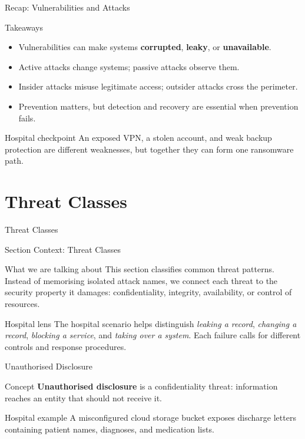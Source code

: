 \documentclass[presentation]{beamer}
\newcommand{\sectiontitleframe}[1]{
\begin{frame}[plain,c]
\begin{center}
{\usebeamerfont{title}\usebeamercolor[fg]{title}#1}
\end{center}
\end{frame}
}
\begin{document}
\begin{frame}[c]{Recap: Vulnerabilities and Attacks}
\begin{block}{Takeaways}
\begin{itemize}
    \item Vulnerabilities can make systems \textbf{corrupted}, \textbf{leaky}, or \textbf{unavailable}.
    \item Active attacks change systems; passive attacks observe them.
    \item Insider attacks misuse legitimate access; outsider attacks cross the perimeter.
    \item Prevention matters, but detection and recovery are essential when prevention fails.
\end{itemize}
\end{block}

\begin{exampleblock}{Hospital checkpoint}
An exposed VPN, a stolen account, and weak backup protection are different weaknesses, but
together they can form one ransomware path.
\end{exampleblock}
\end{frame}

\section{Threat Classes}
\sectiontitleframe{Threat Classes}

\begin{frame}[c]{Section Context: Threat Classes}
\begin{block}{What we are talking about}
This section classifies common threat patterns. Instead of memorising isolated attack names, we
connect each threat to the security property it damages: confidentiality, integrity, availability,
or control of resources.
\end{block}

\begin{exampleblock}{Hospital lens}
The hospital scenario helps distinguish \textit{leaking a record}, \textit{changing a record},
\textit{blocking a service}, and \textit{taking over a system}. Each failure calls for different
controls and response procedures.
\end{exampleblock}
\end{frame}

\begin{frame}[c]{Unauthorised Disclosure}
\begin{block}{Concept}
\textbf{Unauthorised disclosure} is a confidentiality threat: information reaches an entity that
should not receive it.
\end{block}

\begin{exampleblock}{Hospital example}
A misconfigured cloud storage bucket exposes discharge letters containing patient names,
diagnoses, and medication lists.
\end{exampleblock}
\end{frame}
\end{document}
